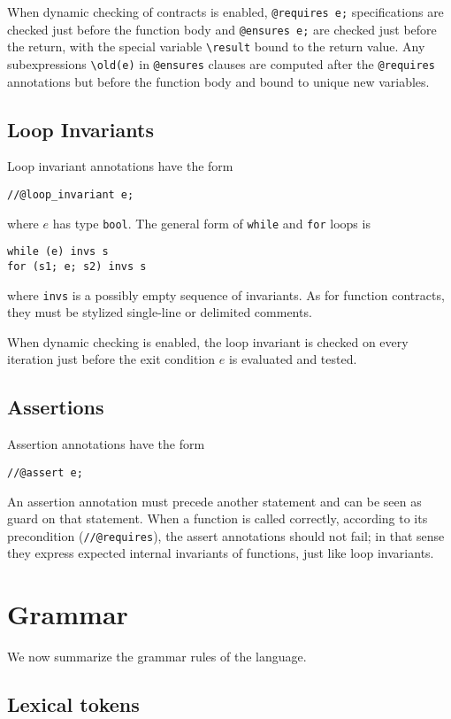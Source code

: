 \documentclass[11pt]{article}
\newcommand{\tbool}{\texttt{bool}}
\begin{document}
When dynamic checking of contracts is enabled,
\verb'@requires e;' specifications are checked just
before the function body and \verb'@ensures e;'
are checked just before the return, with the special
variable \verb'\result' bound to the return value.
Any subexpressions \verb'\old(e)' in \verb'@ensures' clauses
are computed after the \verb'@requires' annotations
but before the function body and bound to unique
new variables.

\subsection{Loop Invariants}

Loop invariant annotations have the form
\begin{verbatim}
//@loop_invariant e;
\end{verbatim}
where $e$ has type \tbool.  The general form of \verb'while'
and \verb'for' loops is
\begin{verbatim}
while (e) invs s
for (s1; e; s2) invs s
\end{verbatim}
where \verb'invs' is a possibly empty sequence of invariants.
As for function contracts, they must be stylized single-line
or delimited comments.

When dynamic checking is enabled, the loop invariant is checked on
every iteration just before the exit condition $e$ is evaluated and
tested.

\subsection{Assertions}

Assertion annotations have the form
\begin{verbatim}
//@assert e;
\end{verbatim}
An assertion annotation must precede another statement and can be seen
as guard on that statement.  When a function is called correctly,
according to its precondition (\verb'//@requires'), the assert
annotations should not fail; in that sense they express expected
internal invariants of functions, just like loop invariants.

\section{Grammar}

We now summarize the grammar rules of the language.

\subsection{Lexical tokens}
\end{document}
